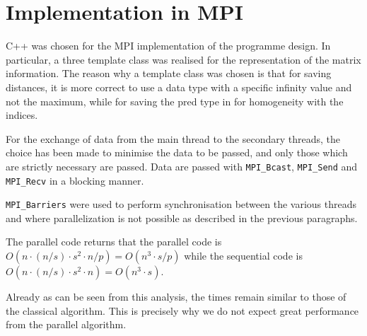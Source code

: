 \section{Implementation in MPI}\label{implementation-in-mpi}

C++ was chosen for the MPI implementation of the programme design. In particular, a three template class was realised for the representation of the matrix information. The reason why a template class was chosen is that for saving distances, it is more correct to use a data type with a specific infinity value and not the maximum, while for saving the pred type in for homogeneity with the indices.

For the exchange of data from the main thread to the secondary threads, the choice has been made to minimise the data to be passed, and only those which are strictly necessary are passed. Data are passed with \texttt{MPI\_Bcast}, \texttt{MPI\_Send} and \texttt{MPI\_Recv} in a blocking manner.

\texttt{MPI\_Barriers} were used to perform synchronisation between the various threads and where parallelization is not possible as described in the previous paragraphs.

The parallel code returns that the parallel code is \(O(n\cdot (n / s)\cdot s^2\cdot n/p) = O(n^3 \cdot  s /p)\) while the sequential code is \(O(n\cdot (n / s)\cdot s^2\cdot n) =  O(n^3 \cdot  s) \).

Already as can be seen from this analysis, the times remain similar to those of the classical algorithm.
This is precisely why we do not expect great performance from the parallel algorithm.

\FloatBarrier

